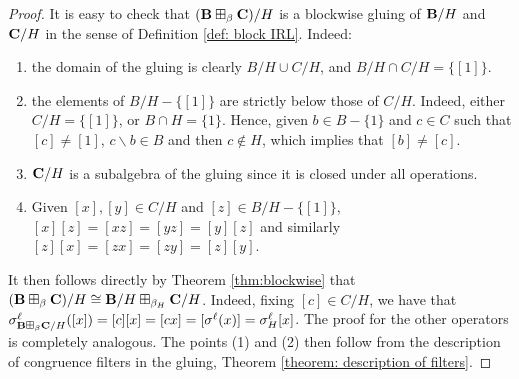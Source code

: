 \documentclass{amsart}
\theoremstyle{definition}
\numberwithin{equation}{section}
\newcommand{\alg}[1]{{\textbf{\upshape #1}}}  %
\newcommand{\sell}{\sigma^\ell}
\begin{document}
\begin{proof}
It is easy to check that $(\alg B \boxplus_\beta \alg C)/H$ is a blockwise gluing of $\alg B /H$ and $\alg C/H$ in the sense of Definition \ref{def: block IRL}. Indeed:
\begin{enumerate}
	\item the domain of the gluing is clearly $B/H \cup C/ H$, and $B/H \cap C/ H = \{[1]\}$.
	\item the elements of $B/H - \{[1]\}$ are strictly below those of $C/ H$. Indeed, either $C/H = \{[1]\}$, or $B \cap H = \{1\}$. Hence, given $b \in B-\{1\}$ and $c \in C$ such that $[c] \neq [1]$, $c \backslash b \in B$ and then $c \notin H$, which implies that $[b] \neq [c]$.
	\item  $\alg C/H$ is a subalgebra of the gluing since it is closed under all operations.
	\item Given $[x], [y] \in C/H$ and $[z] \in B/H-\{[1]\}$, $[x][z] = [xz] = [yz]= [y][z]$ and similarly $[z][x] = [zx] = [zy]= [z][y]$.
\end{enumerate}
It then follows directly by Theorem \ref{thm:blockwise} that $(\alg B \boxplus_\beta \alg C)/H \cong \alg B/H \boxplus_{\beta_H} \alg C/H$. Indeed, fixing $[c] \in C/H$, we have that $\sell_{\alg B \boxplus_\beta \alg C/H}([x]) = [c][x] = [cx] = [\sell(x)] = \sell_H[x]$. The proof for the other operators is completely analogous. The points (1) and (2) then follow from the description of congruence filters in the gluing, Theorem \ref{theorem: description of filters}.
		\end{proof}
	
\end{document}
